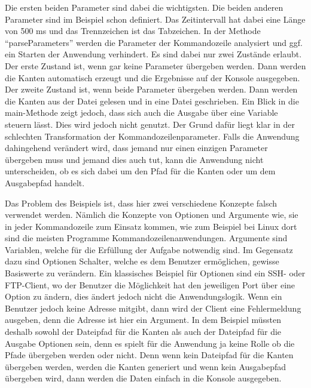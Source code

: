 Die ersten beiden Parameter sind dabei die wichtigsten. Die beiden anderen
Parameter sind im Beispiel schon definiert. Das Zeitintervall hat dabei eine
Länge von 500 ms und das Trennzeichen ist das Tabzeichen. In der Methode
\enquote{parseParameters} werden die Parameter der Kommandozeile analysiert und
ggf. ein Starten der Anwendung verhindert. Es sind dabei nur zwei Zustände
erlaubt. Der erste Zustand ist, wenn gar keine Parameter übergeben werden. Dann
werden die Kanten automatisch erzeugt und die Ergebnisse auf der Konsole
ausgegeben. Der zweite Zustand ist, wenn beide Parameter übergeben werden. Dann
werden die Kanten aus der Datei gelesen und in eine Datei geschrieben. Ein
Blick in die main-Methode zeigt jedoch, dass sich auch die Ausgabe über eine
Variable steuern lässt. Dies wird jedoch nicht genutzt. Der Grund dafür liegt
klar in der schlechten Transformation der Kommandozeilenparameter. Falls die
Anwendung dahingehend verändert wird, dass jemand nur einen einzigen Parameter
übergeben muss und jemand dies auch tut, kann die Anwendung nicht unterscheiden,
ob es sich dabei um den Pfad für die Kanten oder um dem Ausgabepfad handelt.

Das Problem des Beispiels ist, dass hier zwei verschiedene Konzepte falsch
verwendet werden. Nämlich die Konzepte von Optionen und Argumente wie, sie in
jeder Kommandozeile zum Einsatz kommen, wie zum Beispiel bei Linux dort sind die
meisten Programme Kommandozeilenanwendungen. Argumente sind Variablen, welche für
die Erfüllung der Aufgabe notwendig sind. Im Gegensatz dazu sind Optionen
Schalter, welche es dem Benutzer ermöglichen, gewisse Basiswerte zu verändern.
Ein klassisches Beispiel für Optionen sind ein SSH- oder FTP-Client, wo der
Benutzer die Möglichkeit hat den jeweiligen Port über eine Option zu ändern,
dies ändert jedoch nicht die Anwendungslogik. Wenn ein Benutzer jedoch keine
Adresse mitgibt, dann wird der Client eine Fehlermeldung ausgeben, denn die
Adresse ist hier ein Argument. In dem Beispiel müssten deshalb sowohl der
Dateipfad für die Kanten als auch der Dateipfad für die Ausgabe Optionen sein,
denn es spielt für die Anwendung ja keine Rolle ob die Pfade übergeben werden
oder nicht. Denn wenn kein Dateipfad für die Kanten übergeben werden, werden
die Kanten generiert und wenn kein Ausgabepfad übergeben wird, dann werden die
Daten einfach in die Konsole ausgegeben.

